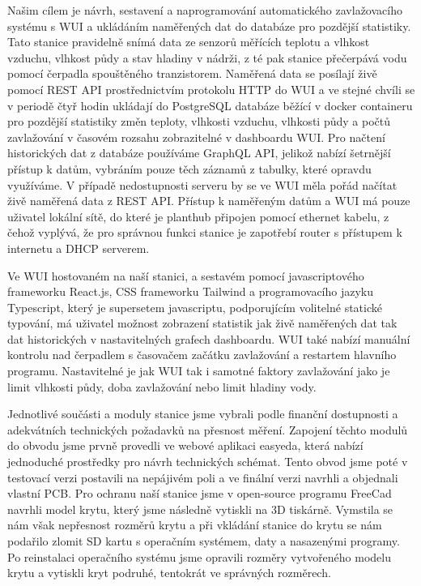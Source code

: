 \documentclass[11pt,a4paper]{article}
\begin{document}
Našim cílem je návrh, sestavení a naprogramování automatického zavlažovacího
systému s WUI a ukládáním naměřených dat do databáze
pro pozdější statistiky. Tato stanice pravidelně snímá data ze senzorů měřících
teplotu a vlhkost vzduchu, vlhkost půdy a stav hladiny v nádrži, z té pak
stanice přečerpává vodu pomocí čerpadla spouštěného tranzistorem. Naměřená data
se posílají živě pomocí REST API prostřednictvím
protokolu HTTP do WUI a ve stejné
chvíli se v periodě čtyř hodin ukládají do PostgreSQL databáze běžící v docker
containeru pro pozdější
statistiky
změn teploty, vlhkosti vzduchu, vlhkosti půdy a počtů zavlažování v časovém
rozsahu zobrazitelné v dashboardu WUI. Pro načtení historických dat z databáze
používáme GraphQL API, jelikož nabízí šetrnější přístup k datům, vybráním pouze
těch záznamů z tabulky, které opravdu využíváme. V případě nedostupnosti
serveru by se ve WUI měla pořád načítat živě naměřená data z REST API. Přístup
k naměřeným datům a
WUI má pouze
uživatel lokální
sítě, do které je planthub připojen pomocí ethernet kabelu, z čehož vyplývá, že
pro správnou funkci
stanice je zapotřebí router s přístupem k internetu a DHCP serverem.

Ve WUI hostovaném na naší stanici, a sestavém pomocí javascriptového frameworku
React.js, CSS frameworku
Tailwind a programovacího jazyku Typescript, který je supersetem javascriptu,
podporujícím volitelné statické typování, má uživatel
možnost zobrazení statistik jak živě naměřených dat tak dat historických v
nastavitelných grafech dashboardu. WUI také nabízí manuální kontrolu nad
čerpadlem s časovačem začátku zavlažování a restartem hlavního programu.
Nastavitelné je jak WUI tak i samotné faktory zavlažování jako je limit
vlhkosti
půdy, doba zavlažování nebo limit hladiny vody.

Jednotlivé součásti a moduly stanice jsme vybrali podle finanční dostupnosti a
adekvátních technických
požadavků na přesnost měření.
Zapojení těchto modulů do obvodu jsme prvně provedli ve webové aplikaci
easyeda, která nabízí jednoduché prostředky pro návrh technických
schémat. Tento obvod jsme poté v testovací verzi postavili na nepájivém
poli a ve finální verzi navrhli a objednali vlastní PCB. Pro ochranu naší
stanice jsme v open-source programu FreeCad navrhli model krytu, který jsme
následně vytiskli na 3D tiskárně. Vymstila se nám však nepřesnost rozměrů krytu
a při vkládání stanice do krytu se nám podařilo zlomit SD kartu s operačním
systémem, daty a nasazenými programy. Po reinstalaci operačního systému jsme
opravili rozměry vytvořeného modelu krytu a
vytiskli kryt podruhé, tentokrát ve správných rozměrech.
\end{document}
